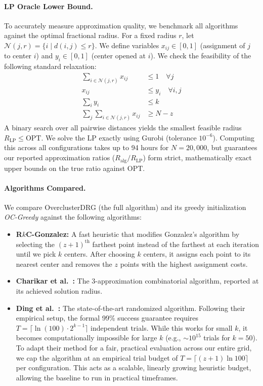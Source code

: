 \documentclass[twoside,leqno,twocolumn]{article}
\newcommand{\OPT}{\mathrm{OPT}}
\newcommand{\rkc}{R$k$C}
\begin{document}
\paragraph{LP Oracle Lower Bound.}
To accurately measure approximation quality, we benchmark all algorithms against the optimal fractional radius. For a fixed radius $r$, let $\mathcal{N}(j,r) = \{i \mid d(i,j) \le r\}$. We define variables $x_{ij} \in [0,1]$ (assignment of $j$ to center $i$) and $y_i \in [0,1]$ (center opened at $i$). We check the feasibility of the following standard relaxation:
\begin{align*}
\sum_{i \in \mathcal{N}(j,r)} x_{ij} &\le 1 \quad \forall j \\
x_{ij} &\le y_i \quad \forall i,j \\
\sum_{i} y_i & \le k \quad  \\
\sum_{j} \sum_{i \in \mathcal{N}(j,r)} x_{ij} & \ge N-z
\end{align*}
A binary search over all pairwise distances yields the smallest feasible radius $R_{\mathrm{LP}} \le \OPT$. We solve the LP exactly using Gurobi (tolerance $10^{-6}$). Computing this across all configurations takes up to 94 hours for $N=20{,}000$, but guarantees our reported approximation ratios ($R_{\mathrm{alg}} / R_{\mathrm{LP}}$) form strict, mathematically exact upper bounds on the true ratio against $\OPT$.

\paragraph{Algorithms Compared.}
We compare OverclusterDRG (the full algorithm) and its greedy initialization {\em OC-Greedy} against the following algorithms:
\begin{itemize}
    \item \textbf{\rkc-Gonzalez:} A fast heuristic that modifies Gonzalez's algorithm by selecting the $(z+1)^{\text{th}}$ farthest point instead of the farthest at each iteration until we pick $k$ centers. After choosing $k$ centers, it assigns each point to its nearest center and removes the $z$ points with the highest assignment costs.

    \item \textbf{Charikar et al.~\cite{charikar2001}:} The $3$-approximation combinatorial algorithm, reported at its achieved solution radius.

    \item \textbf{Ding et al.~\cite{ding2019}:} The state-of-the-art randomized algorithm. Following their empirical setup, the formal 99\% success guarantee requires $T = \lceil \ln(100) \cdot 2^{k-1} \rceil$ independent trials. While this works for small $k$, it becomes computationally impossible for large $k$ (e.g., $\sim 10^{15}$ trials for $k=50$). To adapt their method for a fair, practical evaluation across our entire grid, we cap the algorithm at an empirical trial budget of $T=\lceil(z{+}1)\ln 100\rceil$ per configuration. This acts as a scalable, linearly growing heuristic budget, allowing the baseline to run in practical timeframes.
\end{itemize}
\end{document}
